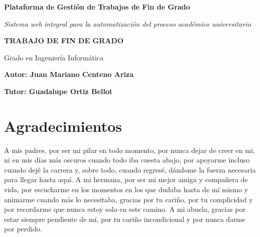 
\begin{titlepage}
\centering


{\huge\bfseries Plataforma de Gestión de Trabajos de Fin de Grado\par}
\vspace{0.5cm}
{\Large\itshape Sistema web integral para la automatización del proceso académico universitario\par}

\vspace{2cm}

{\Large\textbf{TRABAJO DE FIN DE GRADO}\par}
\vspace{0.5cm}
{\large Grado en Ingeniería Informática\par}

\vspace{2.5cm}

\begin{minipage}[t]{0.4\textwidth}
\begin{flushleft}
\large
\textbf{Autor: Juan Mariano Centeno Ariza}
\end{flushleft}
\end{minipage}
\hfill
\begin{minipage}[t]{0.4\textwidth}
\begin{flushright}
\large
\textbf{Tutor: Guadalupe Ortiz Bellot}
\end{flushright}
\end{minipage}

\vfill

\end{titlepage}

\newpage
\thispagestyle{plain}
\chapter*{Agradecimientos}

A mis padres, por ser mi pilar en todo momento, por nunca dejar de creer en mi, ni en mis días más oscuros cuando todo iba cuesta abajo, por apoyarme incluso cuando dejé la carrera y, sobre todo, cuando regresé, dándome la fuerza necesaria para llegar hasta aquí. A mi hermana, por ser mi mejor amiga y compañera de vida, por escucharme en los momentos en los que dudaba hasta de mí mismo y animarme cuando más lo necesitaba, gracias por tu cariño, por tu complicidad y por recordarme que nunca estoy solo en este camino. A mi abuela, gracias por estar siempre pendiente de mí, por tu cariño incondicional y por nunca darme por perdido.


